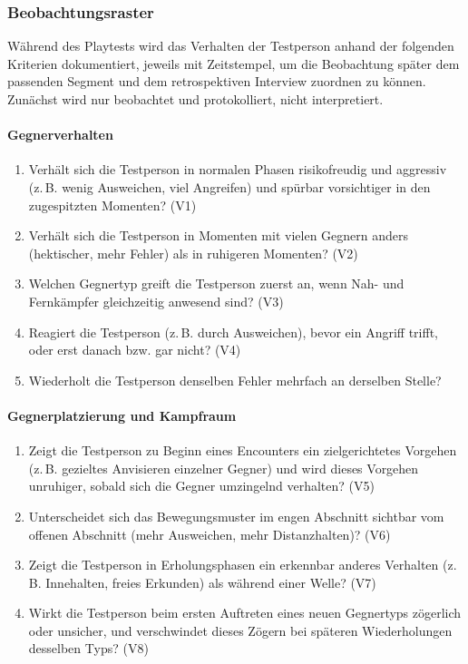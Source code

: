 \documentclass[../Main.tex]{subfiles}
\begin{document}
\subsubsection{Beobachtungsraster}
 
Während des Playtests wird das Verhalten der Testperson anhand der folgenden Kriterien dokumentiert, jeweils mit Zeitstempel, um die Beobachtung später dem passenden Segment und dem retrospektiven Interview zuordnen zu können. Zunächst wird nur beobachtet und protokolliert, nicht interpretiert.
 
\paragraph{Gegnerverhalten}
\begin{enumerate}[label=\textbf{B\arabic*}, leftmargin=1.5cm, itemsep=0.5em]
    \item Verhält sich die Testperson in normalen Phasen risikofreudig und aggressiv (z.\,B. wenig Ausweichen, viel Angreifen) und spürbar vorsichtiger in den zugespitzten Momenten? \hfill (V1)
    \item Verhält sich die Testperson in Momenten mit vielen Gegnern anders (hektischer, mehr Fehler) als in ruhigeren Momenten? \hfill (V2)
    \item Welchen Gegnertyp greift die Testperson zuerst an, wenn Nah- und Fernkämpfer gleichzeitig anwesend sind? \hfill (V3)
    \item Reagiert die Testperson (z.\,B. durch Ausweichen), bevor ein Angriff trifft, oder erst danach bzw. gar nicht? \hfill (V4)
    \item Wiederholt die Testperson denselben Fehler mehrfach an derselben Stelle?
\end{enumerate}
 
\paragraph{Gegnerplatzierung und Kampfraum}
\begin{enumerate}[label=\textbf{B\arabic*}, leftmargin=1.5cm, itemsep=0.5em, resume]
    \item Zeigt die Testperson zu Beginn eines Encounters ein zielgerichtetes Vorgehen (z.\,B. gezieltes Anvisieren einzelner Gegner) und wird dieses Vorgehen unruhiger, sobald sich die Gegner umzingelnd verhalten? \hfill (V5)
    \item Unterscheidet sich das Bewegungsmuster im engen Abschnitt sichtbar vom offenen Abschnitt (mehr Ausweichen, mehr Distanzhalten)? \hfill (V6)
    \item Zeigt die Testperson in Erholungsphasen ein erkennbar anderes Verhalten (z.\,B. Innehalten, freies Erkunden) als während einer Welle? \hfill (V7)
    \item Wirkt die Testperson beim ersten Auftreten eines neuen Gegnertyps zögerlich oder unsicher, und verschwindet dieses Zögern bei späteren Wiederholungen desselben Typs? \hfill (V8)
\end{enumerate}
 
\end{document}
